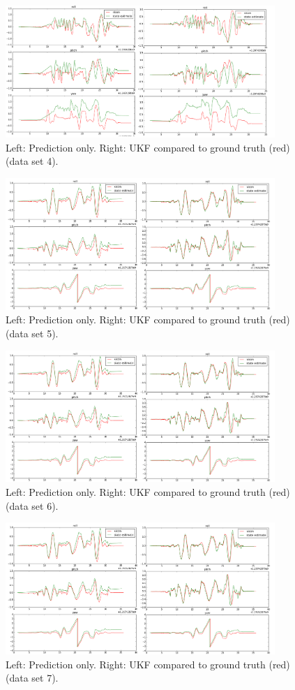 \documentclass[letterpaper, 10 pt, conference]{ieeeconf}  %
\begin{document}
\begin{figure}
  \includegraphics[width=\textwidth,height=5cm]{compare4}
  \caption{Left: Prediction only. Right: UKF compared to ground truth (red) (data set 4).}
  \label{compare4}
\end{figure} 

\begin{figure}
  \includegraphics[width=\textwidth,height=5cm]{compare3}
  \caption{Left: Prediction only. Right: UKF compared to ground truth (red) (data set 5).}
  \label{compare5}
\end{figure}

\begin{figure}
  \includegraphics[width=\textwidth,height=5cm]{compare3}
  \caption{Left: Prediction only. Right: UKF compared to ground truth (red) (data set 6).}
  \label{compare6}
\end{figure} 

\begin{figure}
  \includegraphics[width=\textwidth,height=5cm]{compare3}
  \caption{Left: Prediction only. Right: UKF compared to ground truth (red) (data set 7).}
  \label{compare7}
\end{figure}
\end{document}

